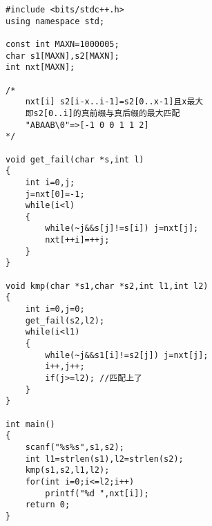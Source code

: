\begin{lstlisting}
#include <bits/stdc++.h>
using namespace std;

const int MAXN=1000005;
char s1[MAXN],s2[MAXN];
int nxt[MAXN];

/*
    nxt[i] s2[i-x..i-1]=s2[0..x-1]且x最大
    即s2[0..i]的真前缀与真后缀的最大匹配
    "ABAAB\0"=>[-1 0 0 1 1 2]
*/

void get_fail(char *s,int l)
{
	int i=0,j;
    j=nxt[0]=-1;
	while(i<l)
	{
		while(~j&&s[j]!=s[i]) j=nxt[j];
		nxt[++i]=++j;
	}
}

void kmp(char *s1,char *s2,int l1,int l2)
{
	int i=0,j=0;
	get_fail(s2,l2);
	while(i<l1)
	{
		while(~j&&s1[i]!=s2[j]) j=nxt[j];
		i++,j++;
		if(j>=l2); //匹配上了
	}
}

int main()
{
	scanf("%s%s",s1,s2);
	int l1=strlen(s1),l2=strlen(s2);
	kmp(s1,s2,l1,l2);
	for(int i=0;i<=l2;i++)
        printf("%d ",nxt[i]);
	return 0;
}
\end{lstlisting}